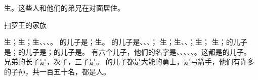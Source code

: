{生{}。这些人和他们的弟兄在{}对面居住。
\par }{\SH 扫罗王的家族
\par }{\PP {}生{}；{}生{}；{}生{}、{}、{}、{}。
的儿子是{}；{}生{}。
的儿子是{}、{}、{}、{}；
生{}；{}生{}、{}、{}；{}生{}；
生{}；{}的儿子是{}；{}的儿子是{}；{}的儿子是{}。
有六个儿子，他们的名字是{}、{}、{}、{}、{}、{}。这都是{}的儿子。
兄弟{}的长子是{}，次子{}，三子是{}。
的儿子都是大能的勇士，是弓箭手，他们有许多的子孙，共一百五十名，都是{}人。

}
